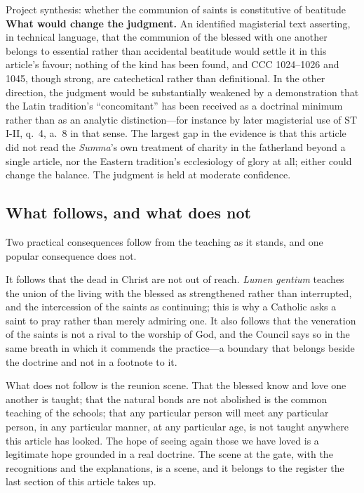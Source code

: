 \begin{studybox}{Project synthesis: whether the communion of saints is constitutive of beatitude}
\smallskip
\textbf{What would change the judgment.} An identified magisterial text asserting, in technical language, that the communion of the blessed with one another belongs to essential rather than accidental beatitude would settle it in this article's favour; nothing of the kind has been found, and CCC 1024--1026 and 1045, though strong, are catechetical rather than definitional. In the other direction, the judgment would be substantially weakened by a demonstration that the Latin tradition's ``concomitant'' has been received as a doctrinal minimum rather than as an analytic distinction---for instance by later magisterial use of ST I-II, q.~4, a.~8 in that sense. The largest gap in the evidence is that this article did not read the \emph{Summa}'s own treatment of charity in the fatherland beyond a single article, nor the Eastern tradition's ecclesiology of glory at all; either could change the balance. The judgment is held at moderate confidence.
\end{studybox}

\subsection{What follows, and what does not}

Two practical consequences follow from the teaching as it stands, and one popular consequence does not.

It follows that the dead in Christ are not out of reach. \emph{Lumen gentium} teaches the union of the living with the blessed as strengthened rather than interrupted, and the intercession of the saints as continuing; this is why a Catholic asks a saint to pray rather than merely admiring one. It also follows that the veneration of the saints is not a rival to the worship of God, and the Council says so in the same breath in which it commends the practice---a boundary that belongs beside the doctrine and not in a footnote to it.

What does not follow is the reunion scene. That the blessed know and love one another is taught; that the natural bonds are not abolished is the common teaching of the schools; that any particular person will meet any particular person, in any particular manner, at any particular age, is not taught anywhere this article has looked. The hope of seeing again those we have loved is a legitimate hope grounded in a real doctrine. The scene at the gate, with the recognitions and the explanations, is a scene, and it belongs to the register the last section of this article takes up.
